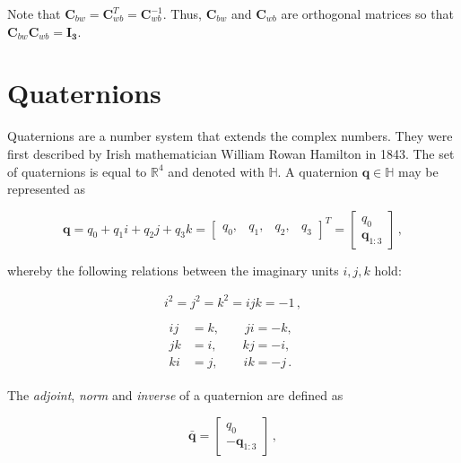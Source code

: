\noindent
Note that $\mathbf{C}_{bw} = \mathbf{C}^T_{wb} = \mathbf{C}^{-1}_{wb}$. Thus, $\mathbf{C}^{ }_{bw}$ and $\mathbf{C}_{wb}$ are orthogonal matrices so that $\mathbf{C}^{ }_{bw} \mathbf{C}_{wb} = \mathbf{I_3}$.  

\section{Quaternions}

Quaternions are a number system that extends the complex numbers. They were first described by Irish mathematician William Rowan Hamilton in 1843. The set of quaternions is equal to $\mathbb{R}^4$ and denoted with $\mathbb{H}$. A quaternion $\mathbf{q} \in \mathbb{H}$ may be represented as

\begin{equation}
  \mathbf{q} = q_0 + q_1 i + q_2 j + q_3 k = \begin{bmatrix}
  	q_0, & q_1, & q_2, & q_3
  \end{bmatrix}^T = \begin{bmatrix}
  	q_0 \\ \mathbf{q}_{1:3} 
  \end{bmatrix}\,,
\end{equation}
 
\noindent
whereby the following relations between the imaginary units $i, j, k$ hold:

\begin{equation}
  \begin{matrix}
i^2 =j^2=k^2=ijk =-1\,,\\ \\
  {\begin{split}
  ij & = k, \qquad ji = -k, \\
jk & = i, \qquad kj = -i, \\
ki & = j, \qquad ik = -j\,.
\end{split}}
\end{matrix}
\end{equation}

The \emph{adjoint}, \emph{norm} and \emph{inverse} of a quaternion are defined as

\begin{equation}
  \bar{\mathbf{q}} = \begin{bmatrix}
  	q_0 \\ -\mathbf{q}_{1:3} 
  \end{bmatrix}\,,
\end{equation}

